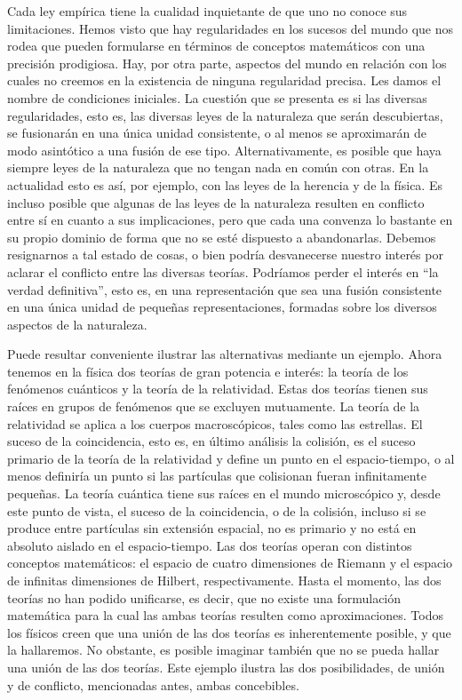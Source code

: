 \documentclass[a4paper, 12pt]{article}
\begin{document}
Cada ley empírica tiene la cualidad inquietante de que uno no conoce sus limitaciones. Hemos visto que hay regularidades en los sucesos del mundo que nos rodea que pueden formularse en términos de conceptos matemáticos con una precisión prodigiosa. Hay, por otra parte, aspectos del mundo en relación con los cuales no creemos en la existencia de ninguna regularidad precisa. Les damos el nombre de condiciones iniciales. La cuestión que se presenta es si las diversas regularidades, esto es, las diversas leyes de la naturaleza que serán descubiertas, se fusionarán en una única unidad consistente, o al menos se aproximarán de modo asintótico a una fusión de ese tipo. Alternativamente, es posible que haya siempre leyes de la naturaleza que no tengan nada en común con otras. En la actualidad esto es así, por ejemplo, con las leyes de la herencia y de la física. Es incluso posible que algunas de las leyes de la naturaleza resulten en conflicto entre sí en cuanto a sus implicaciones, pero que cada una convenza lo bastante en su propio dominio de forma que no se esté dispuesto a abandonarlas. Debemos resignarnos a tal estado de cosas, o bien podría desvanecerse nuestro interés por aclarar el conflicto entre las diversas teorías. Podríamos perder el interés en ``la verdad definitiva'', esto es, en una representación que sea una fusión consistente en una única unidad de pequeñas representaciones, formadas sobre los diversos aspectos de la naturaleza. 

Puede resultar conveniente ilustrar las alternativas mediante un ejemplo. Ahora tenemos en la física dos teorías de gran potencia e interés: la teoría de los fenómenos cuánticos y la teoría de la relatividad. Estas dos teorías tienen sus raíces en grupos de fenómenos que se excluyen mutuamente. La teoría de la relatividad se aplica a los cuerpos macroscópicos, tales como las estrellas. El suceso de la coincidencia, esto es, en último análisis la colisión, es el suceso primario de la teoría de la relatividad y define un punto en el espacio-tiempo, o al menos definiría un punto si las partículas que colisionan fueran infinitamente pequeñas. La teoría cuántica tiene sus raíces en el mundo microscópico y, desde este punto de vista, el suceso de la coincidencia, o de la colisión, incluso si se produce entre partículas sin extensión espacial, no es primario y no está en absoluto aislado en el espacio-tiempo. Las dos teorías operan con distintos conceptos matemáticos: el espacio de cuatro dimensiones de Riemann y el espacio de infinitas dimensiones de Hilbert, respectivamente. Hasta el momento, las dos teorías no han podido unificarse, es decir, que no existe una formulación matemática para la cual las ambas teorías resulten como aproximaciones. Todos los físicos creen que una unión de las dos teorías es inherentemente posible, y que la hallaremos. No obstante, es posible imaginar también que no se pueda hallar una unión de las dos teorías. Este ejemplo ilustra las dos posibilidades, de unión y de conflicto, mencionadas antes, ambas concebibles.
\end{document}
